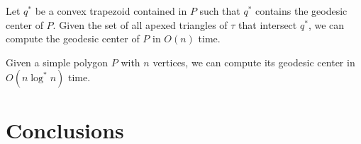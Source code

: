 \documentclass[a4paper,UKenglish]{lipics}
\begin{document}
\begin{theorem}
Let $q^*$ be a convex trapezoid contained in $P$ such that $q^*$ contains the geodesic center of $P$. Given the set of all apexed triangles of $\tau$ that intersect $q^*$, we can compute the geodesic center of $P$ in $O(n)$ time.
\end{theorem}

\begin{corollary}
Given a simple polygon $P$ with $n$ vertices, we can compute its geodesic center in $O(n \log ^* n)$ time.
\end{corollary}

\section{Conclusions}



\end{document}
